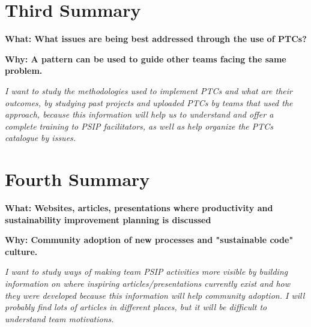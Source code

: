 \documentclass[a4paper]{article}
\begin{document}

\section{Third Summary}
\textbf {What: What issues are being best addressed through the use of PTCs?} \par
\textbf {Why: A pattern can be used to guide other teams facing the same problem.} \par
\textit{I want to study the methodologies used to implement PTCs and what are their outcomes, by studying past projects and uploaded PTCs by teams that used the approach, because this information will help us to understand and offer a complete training to PSIP facilitators, as well as help organize the PTCs catalogue by issues.}




\section{Fourth Summary}
\textbf {What: Websites, articles, presentations where productivity and sustainability improvement planning is discussed} \par
\textbf {Why: Community adoption of new processes and "sustainable code" culture.} \par
\textit{I want to study ways of making team PSIP activities more visible by building information on where inspiring articles/presentations currently exist and how they were developed  because this information will help community adoption. I will probably find lots of articles in different places, but it will be difficult to understand team motivations.}



\end{document}
